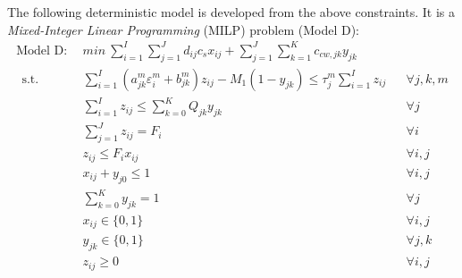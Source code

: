\documentclass[preprint,12pt,authoryear]{elsarticle}
\begin{document}

The following deterministic model is developed from the above constraints. It is a \emph{Mixed-Integer Linear Programming} (MILP) problem (Model D):
\setcounter{equation}{0}
\begin{align}\label{model:D}
	\text{Model D}:~~&min ~ \sum_{i=1}^{I}\sum_{j=1}^{J}d_{ij}c_s x_{ij} + \sum_{j=1}^{J}\sum_{k=1}^{K}c_{cw,jk}y_{jk}\nonumber\\~~
	\mbox{s.t.}~~
	&\sum_{i=1}^{I} (a_{jk}^m \varepsilon_i^m + b_{jk}^m) z_{ij} - M_1(1 - y_{jk}) \leq \tau_j^m \sum_{i=1}^I z_{ij}  && \forall j,k,m\\
 	&\sum_{i=1}^{I} z_{ij} \leq \sum_{k=0}^K Q_{jk} y_{jk} && \forall j\\
	&\sum_{j=1}^J z_{ij} = F_i && \forall i\\
	&z_{ij} \leq F_i x_{ij} && \forall i,j\\
	&x_{ij} + y_{j0} \leq 1 && \forall i,j\\
	&\sum_{k=0}^{K}y_{jk} = 1&&\forall j\\
	&x_{ij} \in \{0,1\}&&\forall i,j\\
	&y_{jk} \in \{0,1\}&&\forall j,k\\
	&z_{ij} \geq 0&&\forall i,j
\end{align}

\end{document}
